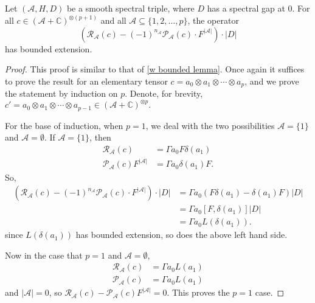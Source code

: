     \begin{lem}\label{first combinatorial lemma} 
        Let $(\mathcal{A},H,D)$ be a smooth spectral triple, where $D$ has a spectral gap at $0$.
        For all $c \in(\mathcal{A}+\mathbb{C})^{\otimes(p+1)}$ and all $\mathscr{A} \subseteq \{1,2,\ldots,p\}$, the operator
        \begin{equation*}
            \left(\mathcal{R}_{\mathscr{A}}(c)-(-1)^{n_{\mathscr{A}}}\mathcal{P}_{\mathscr{A}}(c)\cdot F^{|\mathscr{A}|}\right)\cdot |D|
        \end{equation*}
        has bounded extension.
    \end{lem}
    \begin{proof} 
        This proof is similar to that of \ref{w bounded lemma}. Once again it suffices to prove the result for an elementary tensor $c = a_0\otimes a_1\otimes\cdots \otimes a_p$,
        and we prove the statement by induction on $p$. Denote, for brevity, $c'=a_0\otimes a_1\otimes\cdots\otimes a_{p-1}\in(\mathcal{A}+\mathbb{C})^{\otimes p}.$

        For the base of induction, when $p = 1$, we deal with the two possibilities $\mathscr{A} = \{1\}$ and $\mathscr{A} = \emptyset$. 
        If $\mathscr{A} = \{1\}$, then
        \begin{align*}
            \mathcal{R}_{\mathscr{A}}(c) &= \Gamma a_0F\delta(a_1)\\
            \mathcal{P}_{\mathscr{A}}(c)F^{|\mathscr{A}|} &= \Gamma a_0\delta(a_1)F.
        \end{align*}
        So,
        \begin{align*}
            \left(\mathcal{R}_{\mathscr{A}}(c)-(-1)^{n_{\mathscr{A}}}\mathcal{P}_{\mathscr{A}}(c)\cdot F^{|\mathscr{A}|}\right)\cdot |D| &= \Gamma a_0(F\delta(a_1)-\delta(a_1)F)|D|\\
                                                                                         &= \Gamma a_0[F,\delta(a_1)]|D|\\
                                                                                         &= \Gamma a_0L(\delta(a_1)).
        \end{align*}
        since $L(\delta(a_1))$ has bounded extension, so does the above left hand side.
        
        Now in the case that $p = 1$ and $\mathscr{A} = \emptyset$,
        \begin{align*}
            \mathcal{R}_{\mathscr{A}}(c) &= \Gamma a_0 L(a_1)\\
            \mathcal{P}_{\mathscr{A}}(c) &= \Gamma a_0 L(a_1)
        \end{align*}
        and $|\mathscr{A}| = 0$, so $\mathcal{R}_{\mathscr{A}}(c) - \mathcal{P}_{\mathscr{A}}(c)F^{|\mathscr{A}|} = 0$. This proves the $p = 1$ case.
        

\end{proof}
